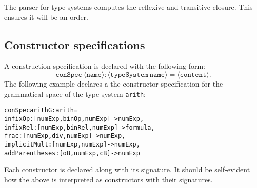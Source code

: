 \documentclass[a4paper]{article}
\theoremstyle{definition}
\begin{document}
	The parser for type systems computes the reflexive and transitive closure. This ensures it will be an order.

	\subsection{Constructor specifications}
	A construction specification is declared with the following form: $$\mathtt{conSpec\ \langle name\rangle : \langle typeSystem\ name\rangle = \langle content\rangle}.$$ The following example declares a the constructor specification for the grammatical space of the type system \texttt{arith}:
\begin{alltt}
conSpec arithG:arith =
    infixOp : [numExp,binOp,numExp] -> numExp,
    infixRel : [numExp,binRel,numExp] -> formula,
    frac : [numExp,div,numExp] -> numExp,
    implicitMult : [numExp,numExp] -> numExp,
    addParentheses : [oB,numExp,cB] -> numExp
\end{alltt}
	Each constructor is declared along with its signature. It should be self-evident how the above is interpreted as constructors with their signatures.
\end{document}
